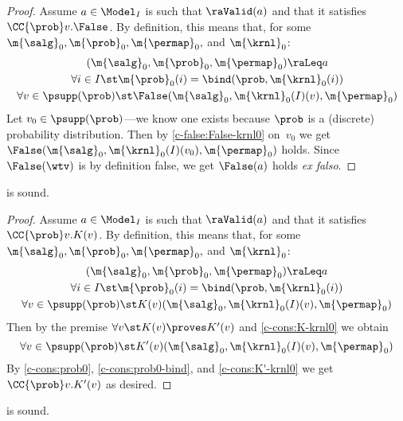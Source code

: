 \begin{proof}
  Assume $a \in \Model_I$ is such that
  $\raValid(a)$ and that it satisfies
  $ \CC{\prob} v.\False $.
  By definition, this means that,
  for some $ \m{\salg}_0, \m{\prob}_0,\m{\permap}_0,$ and $ \m{\krnl}_0 $:
  \begin{gather}
    (\m{\salg}_0, \m{\prob}_0,\m{\permap}_0) \raLeq a
    \label{c-false:prob0}
    \\
    \forall i\in I\st
      \m{\prob}_0(i) = \bind(\prob, \m{\krnl}_0(i))
    \label{c-false:prob0-bind}
    \\
    \forall v \in \psupp(\prob) \st
      \False(\m{\salg}_0, \m{\krnl}_0(I)(v), \m{\permap}_0)
    \label{c-false:False-krnl0}
  \end{gather}
  Let $v_0 \in \psupp(\prob)$---we know one exists because $\prob$
  is a (discrete) probability distribution.
  Then by \eqref{c-false:False-krnl0} on~$v_0$
  we get $\False(\m{\salg}_0, \m{\krnl}_0(I)(v_0), \m{\permap}_0)$ holds.
  Since $\False(\wtv)$ is by definition false,
  we get $\False(a)$ holds \emph{ex falso}.
\end{proof} \begin{lemma}
\label{proof:c-cons}
   is sound.
\end{lemma}

\begin{proof}
  Assume $a \in \Model_I$ is such that
  $\raValid(a)$ and that it satisfies
  $ \CC{\prob} v.K(v) $.
  By definition, this means that,
  for some $ \m{\salg}_0, \m{\prob}_0,\m{\permap}_0,$ and $ \m{\krnl}_0 $:
  \begin{gather}
    (\m{\salg}_0, \m{\prob}_0,\m{\permap}_0) \raLeq a
    \label{c-cons:prob0}
    \\
    \forall i\in I\st
      \m{\prob}_0(i) = \bind(\prob, \m{\krnl}_0(i))
    \label{c-cons:prob0-bind}
    \\
    \forall v \in \psupp(\prob) \st
      K(v)(\m{\salg}_0, \m{\krnl}_0(I)(v), \m{\permap}_0)
    \label{c-cons:K-krnl0}
  \end{gather}
  Then by the premise $\forall v\st K(v) \proves K'(v)$
  and \eqref{c-cons:K-krnl0} we obtain
  \begin{equation}
    \forall v \in \psupp(\prob) \st
      K'(v)(\m{\salg}_0, \m{\krnl}_0(I)(v), \m{\permap}_0)
    \label{c-cons:K'-krnl0}
  \end{equation}
  By
  \eqref{c-cons:prob0}, \eqref{c-cons:prob0-bind}, and \eqref{c-cons:K'-krnl0}
  we get $ \CC{\prob} v.K'(v) $ as desired.
\end{proof} \begin{lemma}
\label{proof:c-frame}
   is sound.
\end{lemma}

